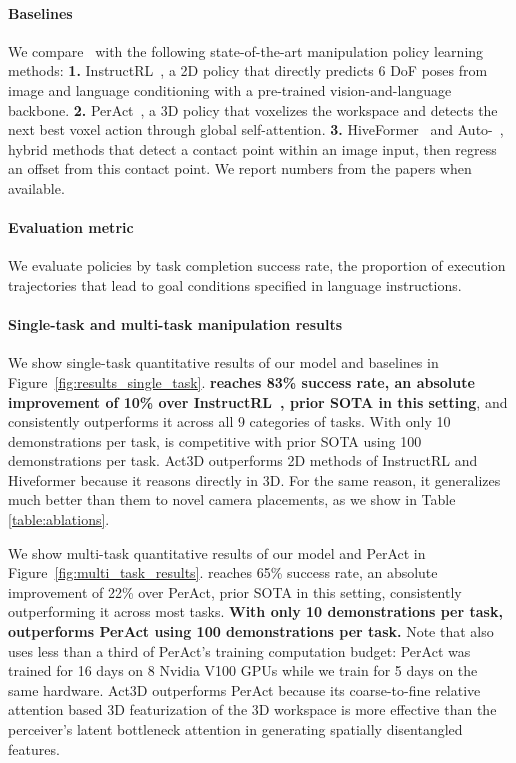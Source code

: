 \paragraph{Baselines} We compare \model{}~with the following state-of-the-art manipulation policy learning methods: 
\textbf{1.} InstructRL~\cite{liu2022instruction}, a 2D policy that directly predicts 6 DoF poses from image and language conditioning with a pre-trained vision-and-language backbone. 
\textbf{2.}  PerAct~\cite{shridhar2023perceiver},  a 3D policy that voxelizes the workspace and detects the next best voxel action through global self-attention. 
\textbf{3.} HiveFormer~\cite{guhur2023instruction} and Auto-~\cite{liu2022auto}, hybrid methods that detect a contact point within an image input, then regress an offset from this contact point. We report numbers from the papers when available.

\paragraph{Evaluation metric} 
We evaluate policies by task completion success rate, the proportion of execution trajectories that lead to goal conditions specified in language instructions.

\paragraph{Single-task and multi-task manipulation results} 
We show single-task quantitative results of our model and baselines in Figure~\ref{fig:results_single_task}. 
\model{} \textbf{reaches 83\% success rate, an absolute improvement of 10\% over InstructRL~\cite{liu2022instruction}, prior SOTA in this setting}, and consistently outperforms it across all 9 categories of tasks.
With only 10 demonstrations per task, \model{} is competitive with prior SOTA using 100 demonstrations per task. 
Act3D outperforms 2D methods of InstructRL and Hiveformer because it reasons directly  in 3D. 
For the same reason, it generalizes much better than them to novel camera placements, as we show in Table \ref{table:ablations}. 














We show multi-task quantitative results of our model and PerAct in Figure~\ref{fig:multi_task_results}.
\model{} reaches 65\% success rate, an absolute improvement of 22\% over PerAct, prior SOTA in this setting, consistently outperforming it across most tasks. 
\textbf{With only 10 demonstrations per task, \model{} outperforms PerAct using 100 demonstrations per task.}
Note that \model{} also uses less than a third of PerAct's training computation budget: PerAct was trained for 16 days on 8 Nvidia V100 GPUs while we train for 5 days on the same hardware. Act3D outperforms PerAct because its coarse-to-fine relative attention based 3D featurization of the 3D workspace is more effective than the perceiver’s latent bottleneck attention in generating spatially  disentangled features. 


